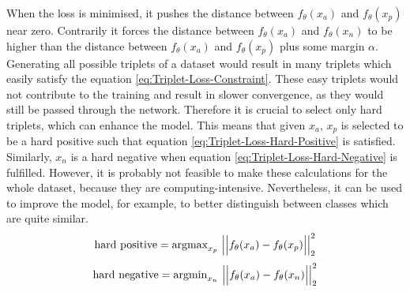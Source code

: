 When the loss is minimised, it pushes the distance between $f_\theta(x_a)$ and $f_\theta(x_p)$ near zero. Contrarily it forces the distance between $f_\theta(x_a)$ and $f_\theta(x_n)$ to be higher than the distance between $f_\theta(x_a)$ and $f_\theta(x_p)$ plus some margin $\alpha$.
\newline
\newline
Generating all possible triplets of a dataset would result in many triplets which easily satisfy the equation \ref{eq:Triplet-Loss-Constraint}. These easy triplets would not contribute to the training and result in slower convergence, as they would still be passed through the network. Therefore it is crucial to select only hard triplets, which can enhance the model. This means that given $x_a$, $x_p$ is selected to be a hard positive such that equation \ref{eq:Triplet-Loss-Hard-Positive} is satisfied. Similarly, $x_n$ is a hard negative when equation \ref{eq:Triplet-Loss-Hard-Negative} is fulfilled. However, it is probably not feasible to make these calculations for the whole dataset, because they are computing-intensive. Nevertheless, it can be used to improve the model, for example, to better distinguish between classes which are quite similar.
\begin{equation}
    \centering
    \text{hard positive} = \text{argmax}_{x_p} \ \Big|\Big|f_\theta(x_a) - f_\theta(x_p)\Big|\Big|_2^2
    \label{eq:Triplet-Loss-Hard-Positive}
\end{equation}
\begin{equation}
    \centering
    \text{hard negative} = \text{argmin}_{x_n} \ \Big|\Big|f_\theta(x_a) - f_\theta(x_n)\Big|\Big|_2^2
    \label{eq:Triplet-Loss-Hard-Negative}
\end{equation}

